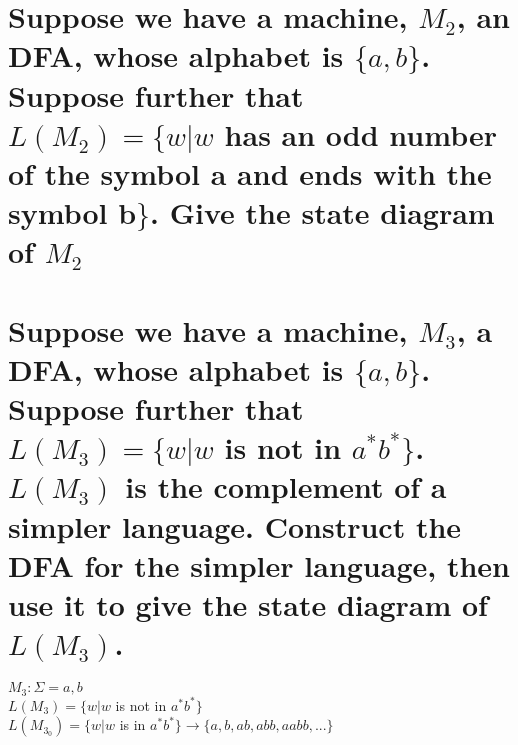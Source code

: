 \documentclass{article}
\begin{document}
\section{Suppose we have a machine, $M_2$, an DFA, whose alphabet is $\{a,b\}$. Suppose further that $L(M_2) = \{w|w$ has an odd number of the symbol a and ends with the symbol b$\}$. Give the state diagram of $M_2$}


\section{Suppose we have a machine, $M_3$, a DFA, whose alphabet is $\{a,b\}$. Suppose further that $L(M_3) = \{w|w$ is not in $a^*b^*\}$. $L(M_3)$ is the complement of a simpler language. Construct the DFA for the simpler language, then use it to give the state diagram of $L(M_3)$.}

$M_3 : \Sigma = {a,b}$ \\
$L(M_3) = \{w | w$ is not in $a^* b^*\}$ \\
$L(M_{3_0}) = \{w | w$ is in $a^* b^*\} \rightarrow \{a, b, ab, abb, aabb, ...\}$ 
\end{document}
